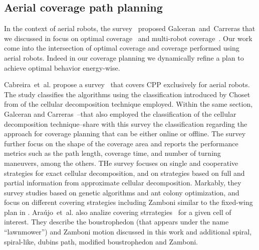 \subsection{Aerial coverage path planning}
\label{sec:cov-plan-aero}

In the context of aerial robots, the survey~\citep{galceran2013survey} proposed Galceran~and~Carreras that we discussed in  focus on optimal coverage~\citep{xu2011optimal} and multi-robot coverage~\citep{ahmadzadeh2008optimization,maza2007multiple,barrientos2011aerial,araujo2013multiple}. Our work come into the intersection of optimal coverage and coverage performed using aerial robots. Indeed in our coverage planning we dynamically refine a plan to achieve optimal behavior energy-wise.

Cabreira~et~al. propose a survey~\citep{cabreira2019survey} that covers CPP exclusively for aerial robots. The study classifies the algorithms using the classification introduced by Choset~\citep{choset2001coverage} from  of the cellular decomposition technique employed. Within the same section, Galceran and Carreras~\citep{galceran2013survey}--that also employed the classification of the cellular decomposition technique--share with this survey the classification regarding the approach for coverage planning that can be either online or offline. The survey further focus on the shape of the coverage area and reports the performance metrics such as the path length, coverage time, and number of turning maneuvers, among the others. THe survey focuses on single and cooperative strategies for exact cellular decomposition, and on strategies based on full and partial information from approximate cellular decomposition. Markably, they survey studies based on genetic algorithms and ant colony optimization, and focus on different covering strategies including Zamboni similar to the fixed-wing plan in .
Ara\'{u}jo~et~al. also analize covering strrategies~\citep{araujo2013multiple} for a given cell of interest. They describe the boustrophedon (that appears under the name ``lawnmower'') and Zamboni motion discussed in this work and additional spiral, spiral-like, dubins path, modified boustrophedon and Zamboni.

